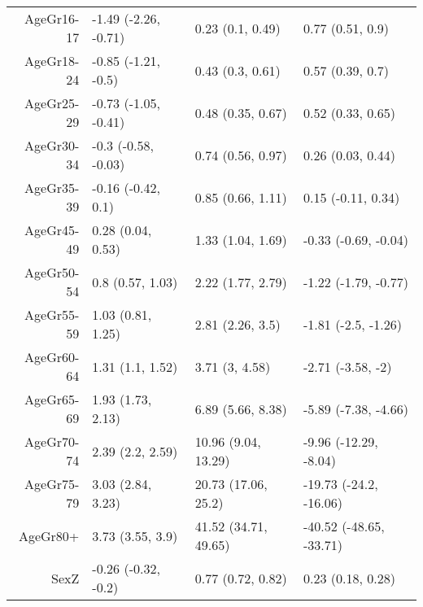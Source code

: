 \begin{table}[ht]
\begin{tabular}{rlll}
  AgeGr16-17 & -1.49 (-2.26, -0.71) & 0.23 (0.1, 0.49) & 0.77 (0.51, 0.9) \\ 
  AgeGr18-24 & -0.85 (-1.21, -0.5) & 0.43 (0.3, 0.61) & 0.57 (0.39, 0.7) \\ 
  AgeGr25-29 & -0.73 (-1.05, -0.41) & 0.48 (0.35, 0.67) & 0.52 (0.33, 0.65) \\ 
  AgeGr30-34 & -0.3 (-0.58, -0.03) & 0.74 (0.56, 0.97) & 0.26 (0.03, 0.44) \\ 
  AgeGr35-39 & -0.16 (-0.42, 0.1) & 0.85 (0.66, 1.11) & 0.15 (-0.11, 0.34) \\ 
  AgeGr45-49 & 0.28 (0.04, 0.53) & 1.33 (1.04, 1.69) & -0.33 (-0.69, -0.04) \\ 
  AgeGr50-54 & 0.8 (0.57, 1.03) & 2.22 (1.77, 2.79) & -1.22 (-1.79, -0.77) \\ 
  AgeGr55-59 & 1.03 (0.81, 1.25) & 2.81 (2.26, 3.5) & -1.81 (-2.5, -1.26) \\ 
  AgeGr60-64 & 1.31 (1.1, 1.52) & 3.71 (3, 4.58) & -2.71 (-3.58, -2) \\ 
  AgeGr65-69 & 1.93 (1.73, 2.13) & 6.89 (5.66, 8.38) & -5.89 (-7.38, -4.66) \\ 
  AgeGr70-74 & 2.39 (2.2, 2.59) & 10.96 (9.04, 13.29) & -9.96 (-12.29, -8.04) \\ 
  AgeGr75-79 & 3.03 (2.84, 3.23) & 20.73 (17.06, 25.2) & -19.73 (-24.2, -16.06) \\ 
  AgeGr80+ & 3.73 (3.55, 3.9) & 41.52 (34.71, 49.65) & -40.52 (-48.65, -33.71) \\ 
  SexZ & -0.26 (-0.32, -0.2) & 0.77 (0.72, 0.82) & 0.23 (0.18, 0.28) \\ 
   \hline
\end{tabular}
\end{table}
